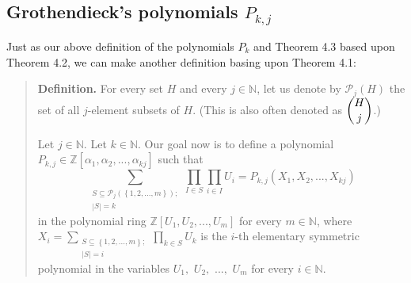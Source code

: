 \documentclass[numbers=enddot,12pt,final,onecolumn,notitlepage]{scrartcl}%
\begin{document}
\subsection{Grothendieck's polynomials $P_{k,j}$}

Just as our above definition of the polynomials $P_{k}$ and Theorem 4.3 based
upon Theorem 4.2, we can make another definition basing upon Theorem 4.1:

\begin{quote}
\textbf{Definition.} For every set $H$ and every $j\in\mathbb{N}$, let us
denote by $\mathcal{P}_{j}\left(  H\right)  $ the set of all $j$-element
subsets of $H.$ (This is also often denoted as $\dbinom{H}{j}$.)

Let $j\in\mathbb{N}$. Let $k\in\mathbb{N}$. Our goal now is to define a
polynomial $P_{k,j}\in\mathbb{Z}\left[  \alpha_{1},\alpha_{2},...,\alpha
_{kj}\right]  $ such that%
\begin{equation}
\sum_{\substack{S\subseteq\mathcal{P}_{j}\left(  \left\{  1,2,...,m\right\}
\right)  ;\\\left\vert S\right\vert =k}}\prod_{I\in S}\prod_{i\in I}%
U_{i}=P_{k,j}\left(  X_{1},X_{2},...,X_{kj}\right)  \label{Pkj1}%
\end{equation}
in the polynomial ring $\mathbb{Z}\left[  U_{1},U_{2},...,U_{m}\right]  $ for
every $m\in\mathbb{N}$, where $X_{i}=\sum\limits_{\substack{S\subseteq\left\{
1,2,...,m\right\}  ;\\\left\vert S\right\vert =i}}\prod\limits_{k\in S}U_{k}$
is the $i$-th elementary symmetric polynomial in the variables $U_{1},$
$U_{2},$ $...,$ $U_{m}$ for every $i\in\mathbb{N}$.


\end{quote}
\end{document}
